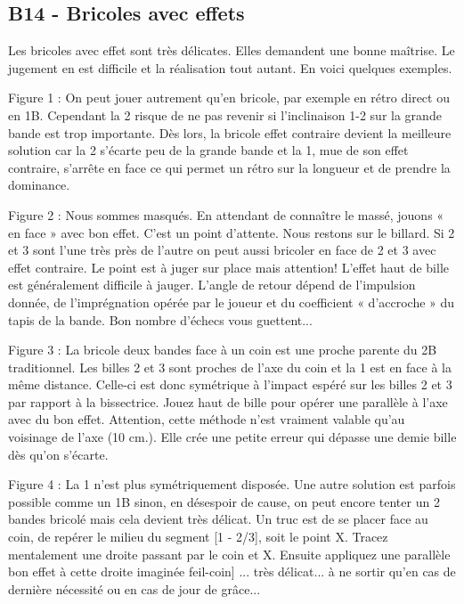 \subsection{B14 - Bricoles avec
effets}\label{b14---bricoles-avec-effets}

Les bricoles avec effet sont très délicates. Elles demandent une bonne
maîtrise. Le jugement en est difficile et la réalisation tout autant. En
voici quelques exemples.

Figure 1 : On peut jouer autrement qu'en bricole, par exemple en rétro
direct ou en 1B. Cependant la 2 risque de ne pas revenir si
l'inclinaison 1-2 sur la grande bande est trop importante. Dès lors, la
bricole effet contraire devient la meilleure solution car la 2 s'écarte
peu de la grande bande et la 1, mue de son effet contraire, s'arrête en
face ce qui permet un rétro sur la longueur et de prendre la dominance.

Figure 2 : Nous sommes masqués. En attendant de connaître le massé,
jouons « en face » avec bon effet. C'est un point d'attente. Nous
restons sur le billard. Si 2 et 3 sont l'une très près de l'autre on
peut aussi bricoler en face de 2 et 3 avec effet contraire. Le point est
à juger sur place mais attention! L'effet haut de bille est généralement
difficile à jauger. L'angle de retour dépend de l'impulsion donnée, de
l'imprégnation opérée par le joueur et du coefficient « d'accroche » du
tapis de la bande. Bon nombre d'échecs vous guettent...

Figure 3 : La bricole deux bandes face à un coin est une proche parente
du 2B traditionnel. Les billes 2 et 3 sont proches de l'axe du coin et
la 1 est en face à la même distance. Celle-ci est donc symétrique à
l'impact espéré sur les billes 2 et 3 par rapport à la bissectrice.
Jouez haut de bille pour opérer une parallèle à l'axe avec du bon effet.
Attention, cette méthode n'est vraiment valable qu'au voisinage de l'axe
(10 cm.). Elle crée une petite erreur qui dépasse une demie bille dès
qu'on s'écarte.

Figure 4 : La 1 n'est plus symétriquement disposée. Une autre solution
est parfois possible comme un 1B sinon, en désespoir de cause, on peut
encore tenter un 2 bandes bricolé mais cela devient très délicat. Un
truc est de se placer face au coin, de repérer le milieu du segment {[}1
- 2/3{]}, soit le point X. Tracez mentalement une droite passant par le
coin et X. Ensuite appliquez une parallèle bon effet à cette droite
imaginée feil-coin{]} ... très délicat... à ne sortir qu'en cas de
dernière nécessité ou en cas de jour de grâce...

